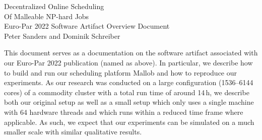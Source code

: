 \documentclass[runningheads]{article}
\numberwithin{dummy}{subsection}
\begin{document}
\begin{center}
\huge Decentralized Online Scheduling\\Of Malleable NP-hard Jobs\\[0.4cm]
\Large Euro-Par 2022 Software Artifact Overview Document\\[0.4cm]
\large Peter Sanders and Dominik Schreiber
\end{center}


%
%
%
%
%
%
%
%

\newenvironment{ttfenv}{\par\vspace{0.2cm}\ttfamily}{\par\vspace{0.2cm}}
\newenvironment{ttfenvcompact}{\par\ttfamily}{\par}

\vspace{0.3cm}

This document serves as a documentation on the software artifact associated with our Euro-Par 2022 publication (named as above).
In particular, we describe how to build and run our scheduling platform Mallob and how to reproduce our experiments.
As our research was conducted on a large configuration (1536--6144 cores) of a commodity cluster with a total run time of around 14\,h, we describe both our original setup as well as a small setup which only uses a single machine with 64 hardware threads and which runs within a reduced time frame where applicable.
As such, we expect that our experiments can be simulated on a much smaller scale with similar qualitative results.
\end{document}
